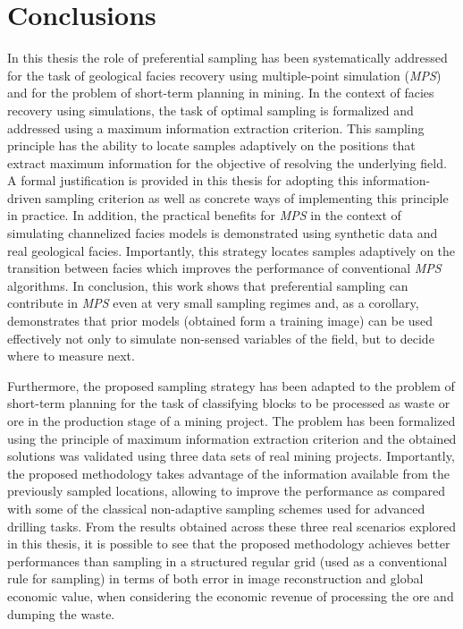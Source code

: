 \chapter{Conclusions}
\label{sec_GENcon}

In this thesis the role of preferential sampling has been systematically addressed for the task of geological facies recovery using multiple-point simulation (\emph{MPS}) and for the problem of short-term planning in mining.  In the context of facies recovery using simulations, the task of optimal sampling is formalized and addressed using a maximum information extraction criterion. This sampling principle has the ability to locate samples adaptively on the positions that extract maximum information for the objective of resolving the underlying field. A formal justification is provided in this thesis for adopting this information-driven sampling criterion as well as concrete ways of implementing this principle in practice. In addition, the practical benefits for \emph{MPS} in the context of simulating channelized facies models is demonstrated using synthetic data and real geological facies. Importantly, this strategy locates samples adaptively on the transition between facies which improves the performance of conventional \emph{MPS} algorithms. In conclusion, this work shows that preferential sampling can contribute in \emph{MPS} even at very small sampling regimes and, as a corollary, demonstrates that prior models (obtained form a training image) can be used effectively not only to simulate non-sensed variables of the field, but to decide where to measure next.

Furthermore, the proposed sampling strategy has been adapted to the problem of short-term planning for the task of classifying blocks to be processed as waste or ore in the production stage of a mining project. The problem has been formalized using the principle of  maximum information extraction criterion and the obtained solutions was validated using three data sets of real mining projects.  Importantly, the proposed methodology takes advantage of the information available from the previously sampled locations, allowing to improve the performance as compared with some of the classical non-adaptive sampling schemes used for advanced drilling tasks. From the results obtained across these three real scenarios explored in this thesis, it is possible to see that the proposed methodology achieves better performances than sampling in a structured regular grid (used as a conventional rule for sampling) in terms of both error in image reconstruction and global economic value, when considering the economic revenue of processing the ore and dumping the waste. 

